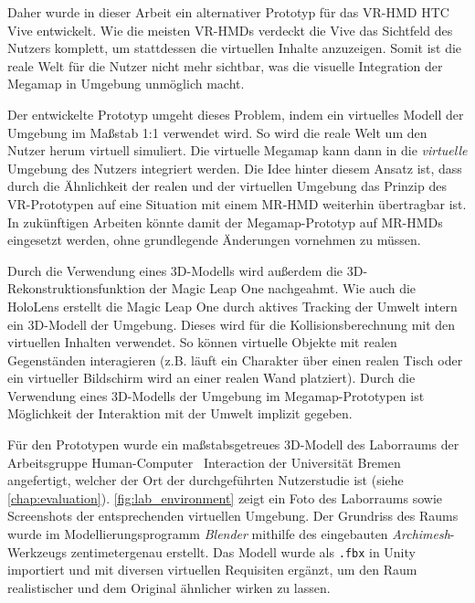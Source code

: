 Daher wurde in dieser Arbeit ein alternativer Prototyp für das VR-HMD HTC Vive entwickelt.
Wie die meisten VR-HMDs verdeckt die Vive das Sichtfeld des Nutzers komplett, um stattdessen die virtuellen Inhalte anzuzeigen.
Somit ist die reale Welt für die Nutzer nicht mehr sichtbar, was die visuelle Integration der Megamap in Umgebung unmöglich macht.

Der entwickelte Prototyp umgeht dieses Problem, indem ein virtuelles Modell der Umgebung im Maßstab 1:1 verwendet wird.
So wird die reale Welt um den Nutzer herum virtuell simuliert.
Die virtuelle Megamap kann dann in die \textit{virtuelle} Umgebung des Nutzers integriert werden.
Die Idee hinter diesem Ansatz ist, dass durch die Ähnlichkeit der realen und der virtuellen Umgebung das Prinzip des VR-Prototypen auf eine Situation mit einem MR-HMD weiterhin übertragbar ist.
In zukünftigen Arbeiten könnte damit der Megamap-Prototyp auf MR-HMDs eingesetzt werden, ohne grundlegende Änderungen vornehmen zu müssen.

Durch die Verwendung eines 3D-Modells wird außerdem die 3D-Rekonstruktionsfunktion der Magic Leap One nachgeahmt.
Wie auch die HoloLens erstellt die Magic Leap One durch aktives Tracking der Umwelt intern ein 3D-Modell der Umgebung.
Dieses wird für die Kollisionsberechnung mit den virtuellen Inhalten verwendet.
So können virtuelle Objekte mit realen Gegenständen interagieren (z.B. läuft ein Charakter über einen realen Tisch oder ein virtueller Bildschirm wird an einer realen Wand platziert).
Durch die Verwendung eines 3D-Modells der Umgebung im Megamap-Prototypen ist Möglichkeit der Interaktion mit der Umwelt implizit gegeben.

Für den Prototypen wurde ein maßstabsgetreues 3D-Modell des Laborraums der Arbeitsgruppe Human-Computer~ Interaction der Universität Bremen angefertigt, welcher der Ort der durchgeführten Nutzerstudie ist (siehe \autoref{chap:evaluation}).
\autoref{fig:lab_environment} zeigt ein Foto des Laborraums sowie Screenshots der entsprechenden virtuellen Umgebung.
Der Grundriss des Raums wurde im Modellierungsprogramm \emph{Blender} mithilfe des eingebauten \emph{Archimesh}-Werkzeugs zentimetergenau erstellt.
Das Modell wurde als \texttt{.fbx} in Unity importiert und mit diversen virtuellen Requisiten ergänzt, um den Raum realistischer und dem Original ähnlicher wirken zu lassen.

